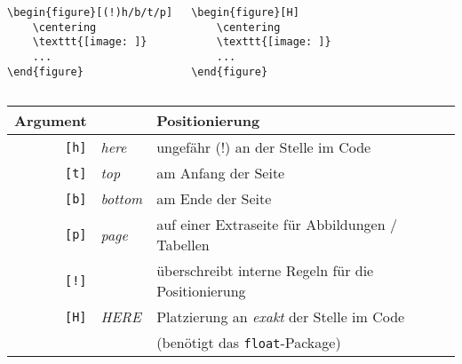 \documentclass["WS\space 16-17\space -\space LaTeX-Kurs\space -\space Praesentation\space -\space 2.tex"]{subfiles}
\begin{document}
\begin{frame}[fragile]
	
\vspace{0.1cm}
\begin{columns}
	\begin{lstlisting}
\begin{figure}[(!)h/b/t/p]
	\centering
	\texttt{[image: ]}
	...
\end{figure}
\end{lstlisting}
	\begin{lstlisting}
\begin{figure}[H]
	\centering
	\texttt{[image: ]}
	...
\end{figure}
	\end{lstlisting}
\end{columns}	
\vspace{-0.1cm}
	\begin{center}
		\begin{tabular}{rl|  p{6.5cm} }
			\toprule
			Argument		&&	Positionierung																			\\ \midrule
		\rule{0pt}{9pt}	 \texttt{[h]}	& \textit{here} &	ungefähr (!) an der Stelle im Code 			\\
		\rule{0pt}{9pt}	 \texttt{[t]}	& \textit{top} &	am Anfang der Seite 																\\
		\rule{0pt}{9pt}	 \texttt{[b]}	& \textit{bottom}&	am Ende der Seite 																\\
		\rule{0pt}{9pt}	 \texttt{[p]}	& \textit{page}&	auf einer Extraseite für Abbildungen / Tabellen 									\\
		\rule{0pt}{9pt}	 \texttt{[!]}	&&	überschreibt interne Regeln für die Positionierung								\\
		\rule{0pt}{9pt}	 \texttt{[H]}	 & \textit{HERE} &	Platzierung an \emph{exakt} der Stelle im Code \\
			&&(benötigt das \texttt{float}-Package)	\\
			\bottomrule
		\end{tabular}
	\end{center}
	\vspace{0.1cm}
\end{frame}
\end{document}
